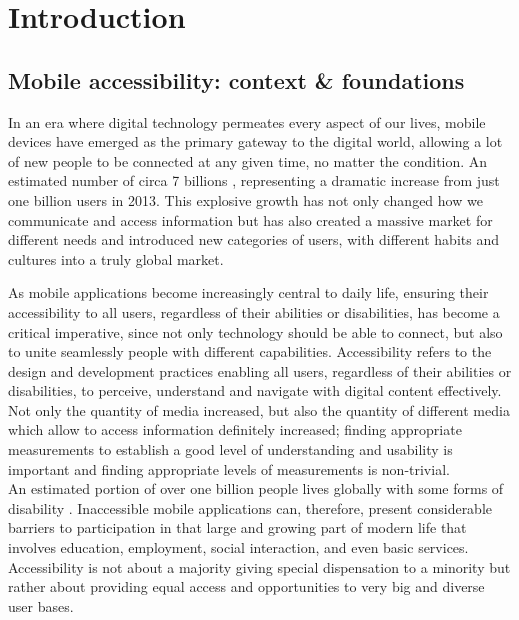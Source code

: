 \chapter{Introduction}
\label{chap:intro}

\section{Mobile accessibility: context \& foundations}
\label{chap:intro-background}

In an era where digital technology permeates every aspect of our lives, mobile devices have emerged as the primary gateway to the digital world, allowing a lot of new people to be connected at any given time, no matter the condition. An estimated number of circa 7 billions \cite{article:number-of-users}, representing a dramatic increase from just one billion users in 2013. This explosive growth has not only changed how we communicate and access information but has also created a massive market for different needs and introduced new categories of users, with different habits and cultures into a truly global market.

As mobile applications become increasingly central to daily life, ensuring their accessibility to all users, regardless of their abilities or disabilities, has become a critical imperative, since not only technology should be able to connect, but also to unite seamlessly people with different capabilities. Accessibility refers to the design and development practices enabling all users, regardless of their abilities or disabilities, to perceive, understand and navigate with digital content effectively. Not only the quantity of media increased, but also the quantity of different media which allow to access information definitely increased; finding appropriate measurements to establish a good level of understanding and usability is important and finding appropriate levels of measurements is non-trivial. \\

An estimated portion of over one billion people lives globally with some forms of disability \cite{article:who-disability}. Inaccessible mobile applications can, therefore, present considerable barriers to participation in that large and growing part of modern life that involves education, employment, social interaction, and even basic services. Accessibility is not about a majority giving special dispensation to a minority but rather about providing equal access and opportunities to very big and diverse user bases.

